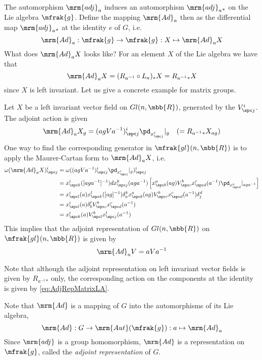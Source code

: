 \documentclass[10pt,reqno]{amsart}
\numberwithin{equation}{section}
\begin{document}
The automorphism $\mrm{adj}_a$ induces an automorphism 
$\mrm{adj}_a{}_\ast$ on the Lie algebra $\mfrak{g}$. Define the 
mapping $\mrm{Ad}_a$ then as the differential map 
$\mrm{adj}_a{}_\ast$ at the identity $e$ of $G$, i.e.\
%
\begin{equation}
	\mrm{Ad}_a : \mfrak{g} \rightarrow \mfrak{g} : X \mapsto 
	\mrm{Ad}_a X
\end{equation}
%
What does $\mrm{Ad}_a X$ looks like? For an element $X$ of the 
Lie algebra we have that
%
\begin{displaymath}
	\mrm{Ad}_a X = (R_{a^{-1}} \circ L_a)_\ast X = 
	R_{a^{-1}}{}_\ast X
\end{displaymath}
%
since $X$ is left invariant. Let us give a concrete example for 
matrix groups.
%
%
\begin{example}
	Let $X$ be a left invariant vector field on $Gl(n,\mbb{R})$, 
	generated by the $V^i_{\spc j}$. The adjoint action is given
	\begin{equation}
		\mrm{Ad}_a X_g = (agVa^{-1})^i_{\spc j} \pd_{x^i_{\spc j}}|_g 
		\quad(= R_{a^{-1}}{}_\ast X_{ag})
	\end{equation}
	One way to find the corresponding generator in 
	$\mfrak{gl}(n,\mbb{R})$ is to apply the Maurer-Cartan form to 
	$\mrm{Ad}_a X$, i.e.\
	\begin{displaymath}
		\begin{split}
			\omega(\mrm{Ad}_a X)^i_{\spc j} &=
	\omega((agVa^{-1})^i_{\spc j} \pd_{x^i_{\spc j}}|_g)^i_{\spc j} 
	\\
	&= x^i_{\spc k}([aga^{-1}]^{-1}) dx^k_{\spc j}(aga^{-1}) \left[ 
		x^a_{\spc b}(ag)V^b_{\spc c} x^c_{\spc d}(a^{-1})
		\pd_{x^a_{\spc d}}|_{aga^{-1}} \right] \\
	&= x^i_{\spc l}(a) x^l_{\spc k}([ag]^{-1}) \delta^k_a
		x^a_{\spc b}(ag) V^b_{\spc c} x^c_{\spc d}(a^{-1}) \delta^d_j 
		\\
	&= x^i_{\spc l}(a) \delta^l_b V^b_{\spc c} x^c_{\spc
		d}(a^{-1}) \\
	&= x^i_{\spc k}(a) V^k_{\spc l} x^l_{\spc j}(a^{-1})
		\end{split}
	\end{displaymath}
	This implies that the adjoint representation of $Gl(n,\mbb{R})$ 
	on $\mfrak{gl}(n,\mbb{R})$ is given by
	\begin{equation}\label{eq:AdjRepMatrixLA}
		\mrm{Ad}_a V = aVa^{-1}
	\end{equation}

	Note that although the adjoint representation on left invariant 
	vector fields is given by $R_{a^{-1}}{}_\ast$ only, the 
	corresponding action on the components at the identity is given 
	by \eqref{eq:AdjRepMatrixLA}.
\end{example}
Note that $\mrm{Ad}$ is a mapping of $G$ into the automorphisms 
of its Lie algebra,
%
\begin{equation}
	\mrm{Ad} : G \rightarrow \mrm{Aut}(\mfrak{g}) : a \mapsto 
	\mrm{Ad}_a
\end{equation}
%
Since $\mrm{adj}$ is a group homomorphism, $\mrm{Ad}$ is a 
representation on $\mfrak{g}$, called the \emph{adjoint 
	representation} of $G$.
%
\end{document}
